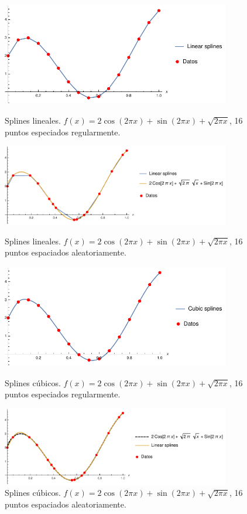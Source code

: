 \documentclass[11pt,letterpaper]{article}
\begin{document}
\begin{figure}
\centering
\includegraphics[width=10cm]{img/25.pdf}
\caption{Splines lineales. $f(x)=2\cos (2\pi x)+\sin (2\pi x)+\sqrt{2\pi x}$, 16 puntos especiados regularmente.}
\includegraphics[width=10cm]{img/26.pdf}
\caption{Splines lineales. $f(x)=2\cos (2\pi x)+\sin (2\pi x)+\sqrt{2\pi x}$, 16 puntos espaciados aleatoriamente.}
\includegraphics[width=10cm]{img/27.pdf}
\caption{Splines cúbicos. $f(x)=2\cos (2\pi x)+\sin (2\pi x)+\sqrt{2\pi x}$, 16 puntos especiados regularmente.}
\includegraphics[width=10cm]{img/28.pdf}
\caption{Splines cúbicos. $f(x)=2\cos (2\pi x)+\sin (2\pi x)+\sqrt{2\pi x}$, 16 puntos espaciados aleatoriamente.}
\end{figure}
\end{document}
